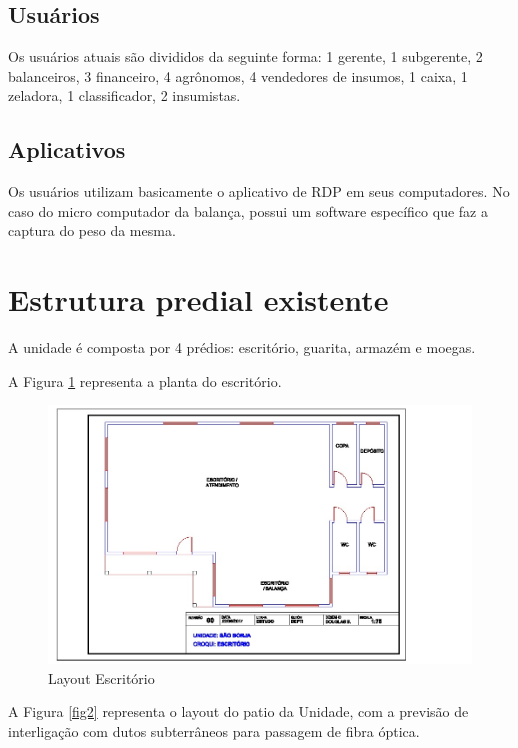 \documentclass[	DIV=calc,%
							paper=a4,%
							fontsize=12pt,%
							onecolumn]{scrartcl}	 					%
\begin{document}
\subsection{Usuários}
Os usuários atuais são divididos da seguinte forma: 1 gerente, 1 subgerente, 2 balanceiros, 3 financeiro, 4 agrônomos, 4 vendedores de insumos, 1 caixa, 1 zeladora, 1 classificador, 2 insumistas.

\subsection{Aplicativos}
Os usuários utilizam basicamente o aplicativo de RDP em seus computadores. No caso do micro computador da balança, possui um software específico que faz a captura do peso da mesma.

\section{Estrutura predial existente}

A unidade é composta por 4 prédios: escritório, guarita, armazém e moegas.

A Figura \ref{fig1} representa a planta do escritório. 

\begin{figure}[H]
	\centering
	\includegraphics[width=\textwidth]{fig1}
	\caption{Layout Escritório}
	\label{fig1}
\end{figure}

A Figura \ref{fig2} representa o layout do patio da Unidade, com a previsão de interligação com dutos subterrâneos para passagem de fibra óptica.
\end{document}
